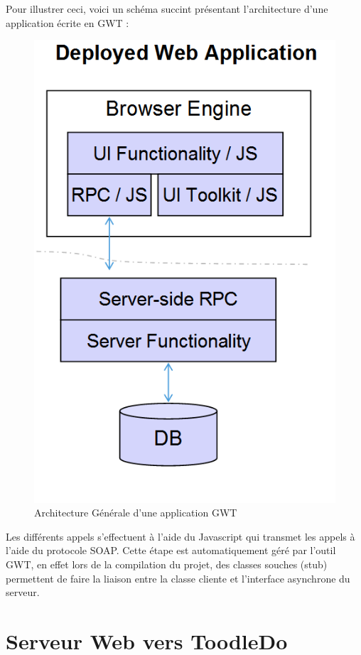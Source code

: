 Pour illustrer ceci, voici un schéma succint présentant l'architecture d'une application écrite en GWT :
\begin{figure}[H]
\begin{center}
\includegraphics[scale=0.5]{gwt.png}
\caption{Architecture Générale d'une application GWT}
\end{center}
\end{figure}

Les différents appels s'effectuent à l'aide du Javascript qui transmet les appels à l'aide du protocole SOAP. Cette étape est automatiquement géré par l'outil GWT, en effet lors de la compilation du projet, des classes souches (stub) permettent de faire la liaison entre la classe cliente et l'interface asynchrone du serveur.

\chapter{Serveur Web vers ToodleDo}

